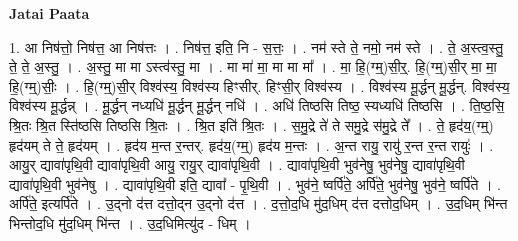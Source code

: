 \documentclass[17pt]{extarticle}
\begin{document}
\textbf{Jatai Paata} \newline

1. आ निष॑त्तो॒ निष॑त्त॒ आ निष॑त्तः । . निष॑त्त॒ इति॒ नि - स॒त्तः॒ । . नम॑ स्ते ते॒ नमो॒ नम॑ स्ते । . ते॒ अ॒स्त्व॒स्तु॒ ते॒ ते॒ अ॒स्तु॒ । . अ॒स्तु॒ मा मा ऽस्त्व॑स्तु॒ मा । . मा मा॑ मा॒ मा मा मा᳚ । . मा॒ हि॒(ग्म्॒)सी॒र्॒. हि॒(ग्म्॒)सी॒र् मा॒ मा॒ हि॒(ग्म्॒)सीः॒ । . हि॒(ग्म्॒)सी॒र् विश्व॑स्य॒ विश्व॑स्य हिꣳसीर्. हिꣳसी॒र् विश्व॑स्य । . विश्व॑स्य मू॒र्द्धन् मू॒र्द्धन्. विश्व॑स्य॒ विश्व॑स्य मू॒र्द्धन्न् । . मू॒र्द्धन् नध्यधि॑ मू॒र्द्धन् मू॒र्द्धन् नधि॑ । . अधि॑ तिष्ठसि तिष्ठ॒ स्यध्यधि॑ तिष्ठसि । . ति॒ष्ठ॒सि॒ श्रि॒तः श्रि॒त स्ति॑ष्ठसि तिष्ठसि श्रि॒तः । . श्रि॒त इति॑ श्रि॒तः । . स॒मु॒द्रे ते॑ ते समु॒द्रे स॑मु॒द्रे ते᳚ । . ते॒ हृद॑य॒(ग्म्॒) हृद॑यम् ते ते॒ हृद॑यम् । . हृद॑य म॒न्त र॒न्तर्. हृद॑य॒(ग्म्॒) हृद॑य म॒न्तः । . अ॒न्त रायु॒ रायु॑ र॒न्त र॒न्त रायुः॑ । . आयु॒र् द्यावा॑पृथि॒वी द्यावा॑पृथि॒वी आयु॒ रायु॒र् द्यावा॑पृथि॒वी । . द्यावा॑पृथि॒वी भुव॑नेषु॒ भुव॑नेषु॒ द्यावा॑पृथि॒वी द्यावा॑पृथि॒वी भुव॑नेषु । . द्यावा॑पृथि॒वी इति॒ द्यावा᳚ - पृ॒थि॒वी । . भुव॑ने॒ ष्वर्पि॑ते॒ अर्पि॑ते॒ भुव॑नेषु॒ भुव॑ने॒ ष्वर्पि॑ते । . अर्पि॑ते॒ इत्यर्पि॑ते । . उ॒द्नो द॑त्त दत्तो॒द्न उ॒द्नो द॑त्त । . द॒त्तो॒द॒धि मु॑द॒धिम् द॑त्त दत्तोद॒धिम् । . उ॒द॒धिम् भि॑न्त भिन्तोद॒धि मु॑द॒धिम् भि॑न्त । . उ॒द॒धिमित्यु॑द - धिम् । \newline
\end{document}
